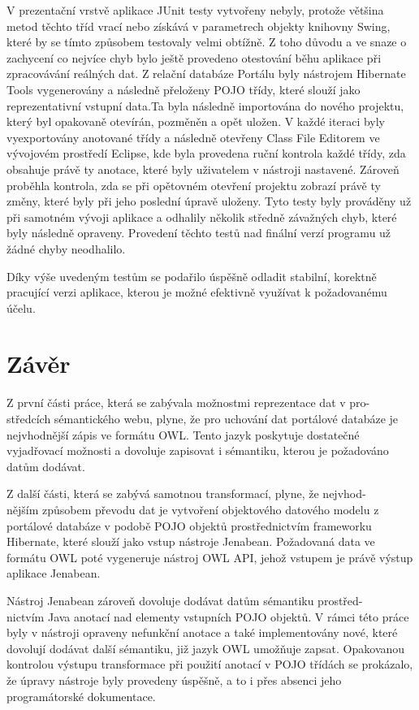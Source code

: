\documentclass{projekt}
\begin{document}
V prezentační vrstvě aplikace JUnit testy vytvořeny nebyly, protože většina metod těchto tříd vrací nebo získává v parametrech objekty knihovny Swing, které by se tímto způsobem testovaly velmi obtížně. Z toho důvodu a ve snaze o zachycení co nejvíce chyb bylo ještě provedeno otestování běhu aplikace při zpracovávání reálných dat. Z relační databáze Portálu byly nástrojem Hibernate Tools vygenerovány a následně přeloženy POJO třídy, které slouží jako reprezentativní vstupní data.Ta byla následně importována do nového projektu, který byl opakovaně otevírán, pozměněn a opět uložen. V každé iteraci byly vyexportovány anotované třídy a následně otevřeny Class File Editorem ve vývojovém prostředí Eclipse, kde byla provedena ruční kontrola každé třídy, zda obsahuje právě ty anotace, které byly uživatelem v nástroji nastavené. Zároveň proběhla kontrola, zda se při opětovném otevření projektu zobrazí právě ty změny, které byly při jeho poslední úpravě uloženy. Tyto testy byly prováděny už při samotném vývoji aplikace a odhalily několik středně závažných chyb, které byly následně opraveny. Provedení těchto testů nad finální verzí programu už žádné chyby neodhalilo.


Díky výše uvedeným testům se podařilo úspěšně odladit stabilní, korektně pracující verzi aplikace, kterou je možné efektivně využívat k požadovanému účelu.


\chapter{Závěr}
\hspace{0.65cm}Z první části práce, která se zabývala možnostmi reprezentace dat v pro-\\středcích sémantického webu, plyne, že pro uchování dat portálové databáze je nejvhodnější zápis ve formátu OWL. Tento jazyk poskytuje dostatečné vyjadřovací možnosti a dovoluje zapisovat i sémantiku, kterou je požadováno datům dodávat.


Z další části, která se zabývá samotnou transformací, plyne, že nejvhod-\\nějším způsobem převodu dat je vytvoření objektového datového modelu z portálové databáze v podobě POJO objektů prostřednictvím frameworku Hibernate, které slouží jako vstup nástroje Jenabean.  
Požadovaná data ve formátu OWL poté vygeneruje nástroj OWL API, jehož vstupem je právě výstup aplikace Jenabean.


Nástroj Jenabean zároveň dovoluje dodávat datům sémantiku prostřed-\\nictvím Java anotací nad elementy vstupních POJO objektů. V rámci této práce byly v nástroji opraveny nefunkční anotace a také implementovány nové, které dovolují dodávat další sémantiku, již jazyk OWL umožňuje zapsat. Opakovanou kontrolou výstupu transformace při použití anotací v POJO třídách se prokázalo, že úpravy nástroje byly provedeny úspěšně, a to i přes absenci jeho programátorské dokumentace.
\end{document}
